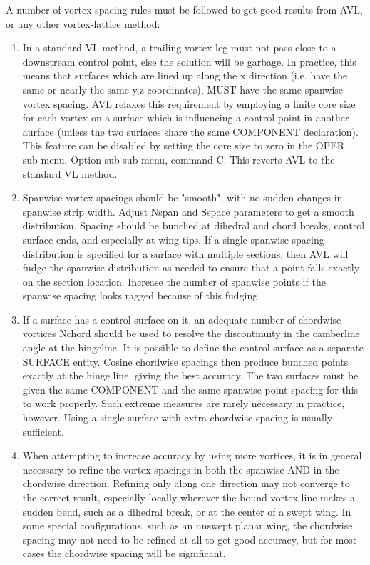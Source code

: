 A number of vortex-spacing rules must be followed to get good results 
from AVL, or any other vortex-lattice method:
\begin{enumerate}
\item  In a standard VL method, a trailing vortex leg must not pass 
close to a downstream control point, else the solution will be garbage.  
In practice, this means that surfaces which are lined up along 
the x direction (i.e. have the same or nearly the same y,z coordinates), 
MUST have the same spanwise vortex spacing.  AVL relaxes this requirement
by employing a finite core size for each vortex on a surface which is 
influencing a control point in another aurface (unless the two surfaces
share the same COMPONENT declaration).  This feature can be disabled
by setting the core size to zero in the OPER sub-menu, Option 
sub-sub-menu, command C.  This reverts AVL to the standard VL method.

\item Spanwise vortex spacings should be "smooth", with no sudden
changes in spanwise strip width.  Adjust Nspan and Sspace parameters
to get a smooth distribution.  Spacing should be bunched at
dihedral and chord breaks, control surface ends, and especially
at wing tips.  If a single spanwise spacing distribution is specified 
for a surface with multiple sections, then AVL will fudge the spanwise 
distribution as needed to ensure that a point falls exactly
on the section location.  Increase the number of spanwise points
if the spanwise spacing looks ragged because of this fudging.

\item If a surface has a control surface on it, an adequate number
of chordwise vortices Nchord should be used to resolve the 
discontinuity in the camberline angle at the hingeline.  It is 
possible to define the control surface as a separate SURFACE
entity.  Cosine chordwise spacings then produce bunched points 
exactly at the hinge line, giving the best accuracy.  The two 
surfaces must be given the same COMPONENT and the same spanwise point 
spacing for this to work properly. Such extreme measures are 
rarely necessary in practice, however.  Using a single surface 
with extra chordwise spacing is usually sufficient.

\item When attempting to increase accuracy by using more vortices,
it is in general necessary to refine the vortex spacings in both 
the spanwise AND in the chordwise direction.  Refining only
along one direction may not converge to the correct result,
especially locally wherever the bound vortex line makes a sudden bend,
such as a dihedral break, or at the center of a swept wing.
In some special configurations, such as an unswept planar wing, 
the chordwise spacing may not need to be refined at all to
get good accuracy, but for most cases the chordwise spacing 
will be significant.
\end{enumerate}






